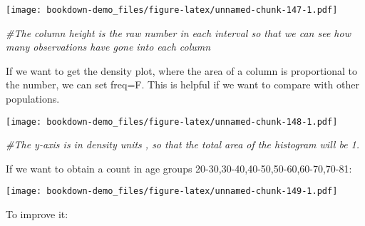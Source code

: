 \documentclass[]{book}
\newenvironment{Shaded}{\begin{snugshade}}{\end{snugshade}}
\newcommand{\KeywordTok}[1]{\textcolor[rgb]{0.13,0.29,0.53}{\textbf{#1}}}
\newcommand{\DataTypeTok}[1]{\textcolor[rgb]{0.13,0.29,0.53}{#1}}
\newcommand{\DecValTok}[1]{\textcolor[rgb]{0.00,0.00,0.81}{#1}}
\newcommand{\StringTok}[1]{\textcolor[rgb]{0.31,0.60,0.02}{#1}}
\newcommand{\CommentTok}[1]{\textcolor[rgb]{0.56,0.35,0.01}{\textit{#1}}}
\newcommand{\OperatorTok}[1]{\textcolor[rgb]{0.81,0.36,0.00}{\textbf{#1}}}
\newcommand{\NormalTok}[1]{#1}
\theoremstyle{definition}
\theoremstyle{definition}
\theoremstyle{definition}
\theoremstyle{remark}
\begin{document}
\texttt{[image: bookdown-demo\_files/figure-latex/unnamed-chunk-147-1.pdf]}

\begin{Shaded}
\begin{Highlighting}[]
\CommentTok{#The column height is the raw number in each interval so that we can see how many observations have gone into each column}
\end{Highlighting}
\end{Shaded}

If we want to get the density plot, where the area of a column is
proportional to the number, we can set freq=F. This is helpful if we
want to compare with other populations.

\begin{Shaded}
\end{Shaded}

\texttt{[image: bookdown-demo\_files/figure-latex/unnamed-chunk-148-1.pdf]}

\begin{Shaded}
\begin{Highlighting}[]
\CommentTok{#The y-axis is in density units , so that the total area of the histogram will be 1. }
\end{Highlighting}
\end{Shaded}

If we want to obtain a count in age groups
20-30,30-40,40-50,50-60,60-70,70-81:

\begin{Shaded}
\end{Shaded}

\texttt{[image: bookdown-demo\_files/figure-latex/unnamed-chunk-149-1.pdf]}

To improve it:
\end{document}
